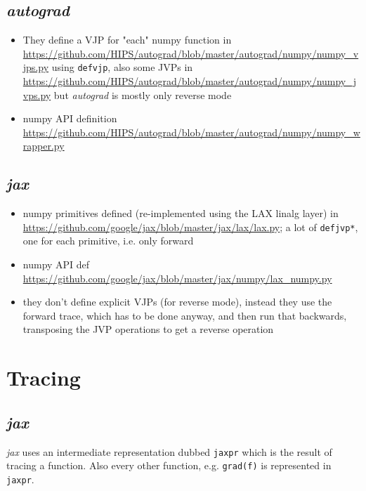 \documentclass[paper=a4,11pt,headsepline]{scrartcl}
\newcommand{\soft}[1]{\textsl{#1}\xspace}
\newcommand{\jax}{\soft{jax}}
\newcommand{\autograd}{\soft{autograd}}
\newcommand{\co}[1]{\texttt{#1}}
\begin{document}
\subsection{\autograd}

\begin{itemize}
    \item They define a VJP for "each" numpy function in
        \url{https://github.com/HIPS/autograd/blob/master/autograd/numpy/numpy_vjps.py}
        using \co{defvjp}, also some JVPs in
        \url{https://github.com/HIPS/autograd/blob/master/autograd/numpy/numpy_jvps.py}
        but \autograd is mostly only reverse mode
    \item numpy API definition
        \url{https://github.com/HIPS/autograd/blob/master/autograd/numpy/numpy_wrapper.py}
\end{itemize}

\subsection{\jax}

\begin{itemize}
    \item numpy primitives defined (re-implemented using the LAX linalg layer) in
        \url{https://github.com/google/jax/blob/master/jax/lax/lax.py};
        a lot of \co{defjvp*}, one for each primitive, i.e. only forward
    \item numpy API def
        \url{https://github.com/google/jax/blob/master/jax/numpy/lax_numpy.py}
    \item they don't define explicit VJPs (for reverse mode), instead they use
        the forward trace, which has to be done anyway, and then run that
        backwards, transposing the JVP operations to get a reverse operation
\end{itemize}

\section{Tracing}

\subsection{\jax}

\jax uses an intermediate representation
dubbed \co{jaxpr} which is the result of tracing a function. Also every
other function, e.g. \co{grad(f)} is represented in \co{jaxpr}.
\end{document}
